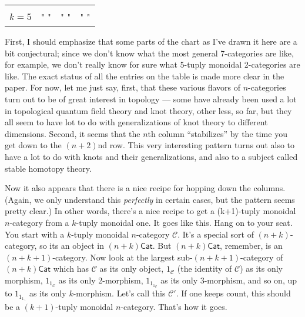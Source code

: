 \documentclass{article}
\begin{document}
\begin{longtable}[]{@{}llll@{}}
\begin{minipage}[t]{0.21\columnwidth}
\strut
\end{minipage}\tabularnewline
\begin{minipage}[t]{0.26\columnwidth}\raggedright
\(k=5\)\strut
\end{minipage} & \begin{minipage}[t]{0.21\columnwidth}\raggedright
" "\strut
\end{minipage} & \begin{minipage}[t]{0.21\columnwidth}\raggedright
" "\strut
\end{minipage} & \begin{minipage}[t]{0.21\columnwidth}\raggedright
" "\strut
\end{minipage}\tabularnewline
\bottomrule
\end{longtable}

First, I should emphasize that some parts of the chart as I've drawn it
here are a bit conjectural; since we don't know what the most general
7-categories are like, for example, we don't really know for sure what
5-tuply monoidal 2-categories are like. The exact status of all the
entries on the table is made more clear in the paper. For now, let me
just say, first, that these various flavors of \(n\)-categories turn out
to be of great interest in topology --- some have already been used a
lot in topological quantum field theory and knot theory, other less, so
far, but they all seem to have lot to do with generalizations of knot
theory to different dimensions. Second, it seems that the \(n\)th column
``stabilizes'' by the time you get down to the \((n+2)\)nd row. This
very interesting pattern turns out also to have a lot to do with knots
and their generalizations, and also to a subject called stable homotopy
theory.

Now it also appears that there is a nice recipe for hopping down the
columns. (Again, we only understand this \emph{perfectly} in certain
cases, but the pattern seems pretty clear.) In other words, there's a
nice recipe to get a (k+1)-tuply monoidal \(n\)-category from a
\(k\)-tuply monoidal one. It goes like this. Hang on to your seat. You
start with a \(k\)-tuply monoidal \(n\)-category \(\mathcal{C}\). It's a
special sort of \((n+k)\)-category, so its an object in
\((n+k)\mathsf{Cat}\). But \((n+k)\mathsf{Cat}\), remember, is an
\((n+k+1)\)-category. Now look at the largest sub-\((n+k+1)\)-category
of \((n+k)\mathsf{Cat}\) which has \(\mathcal{C}\) as its only object,
\(1_{\mathcal{C}}\) (the identity of \(\mathcal{C}\)) as its only
morphism, \(1_{1_{\mathcal{C}}}\) as its only 2-morphism,
\(1_{1_{1_{\mathcal{C}}}}\) as its only 3-morphism, and so on, up to
\(1_{1_{1_{\ddots}}}\) as its only \(k\)-morphism. Let's call this
\(\mathcal{C}'\). If one keeps count, this should be a \((k+1)\)-tuply
monoidal \(n\)-category. That's how it goes.
\end{document}
